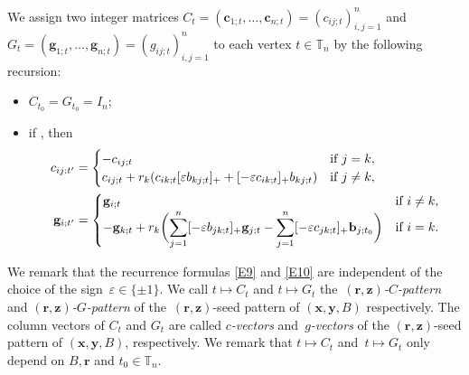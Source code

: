 \documentclass[11pt]{article}
\numberwithin{equation}{section}
\numberwithin{equation}{section}
\begin{document}
We assign two integer matrices $C_t=(\mathbf{c}_{1;t},\dots,\mathbf{c}_{n;t} )=(c_{ij;t})_{i,j=1}^n$ and $G_t=(\mathbf{g}_{1;t},\dots, \mathbf{g}_{n;t})=(g_{ij;t})_{i,j=1}^n$ to each vertex $t\in \mathbb{T}_n$ by the following recursion:
\begin{itemize}\itemsep=0pt
 \item $C_{t_0}=G_{t_0}=I_n$;
 \item if , then
 \begin{align}
 c_{ij:t'}&=
 \begin{cases}
 -c_{ij;t} & \text{if $j=k$},\\
 c_{ij;t}+r_k(c_{ik;t}[\varepsilon b_{kj;t}]_++[-\varepsilon c_{ik;t}]_+b_{kj;t})& \text{if $ j\neq k$},
 \end{cases}\label{E9}\\
 \mathbf{g}_{i;t'}&=
 \begin{cases}
 \mathbf{g}_{i;t} & \text{if $i\neq k$},\\
 \displaystyle-\mathbf{g}_{k;t}+r_k\biggl(\sum\limits_{j=1}^{n}[-\varepsilon b_{jk;t}]_+\mathbf{g}_{j;t}-\sum\limits_{j=1}^{n}[-\varepsilon c_{jk;t}]_+\mathbf{b}_{j;t_0}\biggr) & \text{if $i=k$}.
 \end{cases}\label{E10}
 \end{align}
\end{itemize}
We remark that the recurrence formulas \eqref{E9} and \eqref{E10} are independent of the choice of the sign~${\varepsilon\in \{\pm 1\}}$.
We call $t\mapsto C_t$ and $t\mapsto G_t$ the~{\it $(\mathbf{r},\mathbf{z})$-$C$-pattern} and {\it $(\mathbf{r},\mathbf{z})$-$G$-pattern} of the~$(\mathbf{r},\mathbf{z})$-seed pattern of $(\mathbf{x},\mathbf{y}, B)$ respectively.
The column vectors of $C_t$ and $G_t$ are called {\it $c$-vectors} and~{\it $g$-vectors} of the $(\mathbf{r},\mathbf{z})$-seed pattern of $(\mathbf{x},\mathbf{y}, B)$, respectively. We remark that $t\mapsto C_t$ and~${t\mapsto G_t}$ only depend on $B, \mathbf{r}$ and $t_0\in \mathbb{T}_n$.
\end{document}
